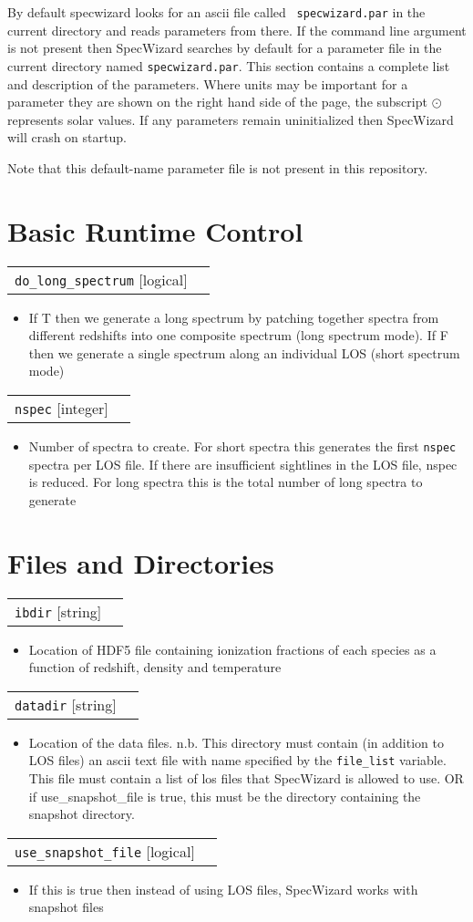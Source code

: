 \documentclass{report}
\makeatletter
\newcommand{\paramdefinition}[3]{
\begin{tabular*}{\textwidth}{l@{\extracolsep{\fill}}r}
		{\tt #1} [{\sc #2}]& #3 \\
\end{tabular*}}
\newcommand{\paramdescription}[1]{
\begin{itemize}
\item #1
\end{itemize}\vspace{0.2cm}}
\makeatother
\begin{document}
By default specwizard looks for an ascii file called {\tt
  specwizard.par} in the current directory and reads parameters from
there.  If the command line argument is not present then SpecWizard
searches by default for a parameter file in the current directory
named {\tt specwizard.par}.  This section contains a complete list and
description of the parameters.  Where units may be important for a
parameter they are shown on the right hand side of the page, the
subscript ${\odot}$ represents solar values.  If any parameters remain
uninitialized then SpecWizard will crash on startup.  \linebreak

Note that this default-name parameter file is not present in this repository.

\section{Basic Runtime Control}

\paramdefinition{do\_long\_spectrum}{logical}{}
\paramdescription{If T then we generate a long spectrum by patching together spectra from different redshifts into one composite spectrum (long spectrum mode).  If F then we generate a single spectrum along an individual LOS (short spectrum mode)}

\paramdefinition{nspec}{integer}{}
\paramdescription{Number of spectra to create.  For short spectra this generates the first {\tt nspec} spectra per LOS file. If there are insufficient sightlines in the LOS file, nspec is reduced. For long spectra this is the total number of long spectra to generate}


\section{Files and Directories}

\paramdefinition{ibdir}{string}{}
\paramdescription{Location of HDF5 file containing ionization fractions of each species as a function of redshift, density and temperature}

\paramdefinition{datadir}{string}{}
\paramdescription{Location of the data files.  n.b. This directory must contain (in addition to LOS files) an ascii text file with name specified by the {\tt file\_list} variable.  This file must contain a list of los files that SpecWizard is allowed to use. OR if use\_snapshot\_file is true, this must be the directory containing the snapshot directory.}

\paramdefinition{use\_snapshot\_file}{logical}{}
\paramdescription{If this is true then instead of using LOS files, SpecWizard works with snapshot files}
\end{document}
